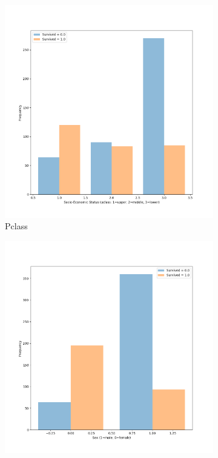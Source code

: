 \documentclass[11pt]{article}
\begin{document}
\begin{itemize}
\begin{enumerate}
\begin{figure}
        \begin{subfigure}[b]{0.49\textwidth}
          \includegraphics[width=\textwidth]{figs/pclass.png}
          \caption{Pclass}
        \end{subfigure}
        \begin{subfigure}[b]{0.49\textwidth}
          \includegraphics[width=\textwidth]{figs/sex.png}

\end{subfigure}
\end{figure}
\end{enumerate}
\end{itemize}
\end{document}
